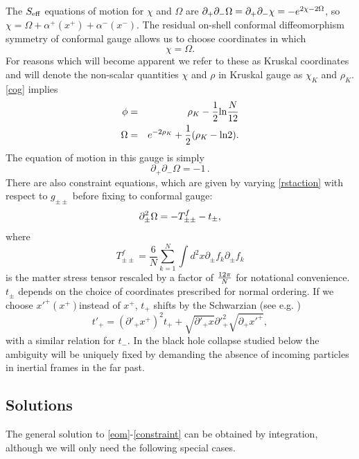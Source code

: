 \documentclass[11pt,oneside,letterpaper]{article}
\newcommand{\f}{\frac}
\newcommand{\be}{\begin{equation}}
\newcommand{\ee}{\end{equation}}
\def\be{\begin{eqnarray}}
\def\ee{\end{eqnarray}}
\newcommand{\bea}{\begin{eqnarray}}
\newcommand{\eea}{\end{eqnarray}}
\let\f=\frac
\def\be{\begin{equation}}
\def\ee{\end{equation}}
\def\del{\partial}
\def\log{{\rm ln}}
\numberwithin{equation}{section}
\def \be {\begin{equation}}
\def \ee {\end{equation}}
\begin{document}
The $S_{\rm eff}$ equations of motion for $\chi$ and $\Omega$ are $\partial_+ \partial_- \Omega = \partial_+ \partial_- \chi= - e^{2 \chi - 2 \Omega}$, so $\chi = \Omega + \alpha^+(x^+) + \alpha^-(x^-)$. The residual on-shell conformal diffeomorphism symmetry of conformal gauge allows us to choose coordinates in which  \be\label{cog} \chi = \Omega.\ee 
For reasons which will become apparent we refer to these as Kruskal coordinates and will denote the non-scalar quantities $\chi$ and $\rho$ in Kruskal gauge as $\chi_K$ and $\rho_K$. \eqref{cog} implies \bea \label{rp} \phi&=&\rho_K - \frac{1}{2}\log \frac{N}{12}\cr \Omega &=& e^{-2\rho_K} + \frac{1}{2}(\rho_K  - \log 2).\eea The equation of motion in this gauge is simply 
\be\label{eom}
\partial_+\partial_- \Omega = -1\,.
\ee
There are also constraint equations, which are given by varying \eqref{rstaction} with respect to $g_{\pm \pm}$ before fixing to conformal gauge:
\be\label{constraint}
\partial_\pm^2 \Omega = -T^{f}_{\pm \pm}-t_\pm \\,
\ee
where 
\be\label{rds}T^f_{\pm\pm}= \f{6}{N}\sum_{k=1}^N\int d^2 x \del_\pm f_k\del_\pm f_k \ee
is the matter stress tensor rescaled by a factor of $12 \pi \over N$ for notational convenience.
 $t_\pm$ depends on the  choice of coordinates prescribed  for normal ordering. If we choose ${x'}^+(x^+)$instead of $x^+$, $t_+$ shifts by the Schwarzian (see e.g. \cite{Fiola:1994ir})
\be\label{sch} t'_+=({\del'}_+ x^+)^2t_++\sqrt{{\del'}_+x}{\del'}_+^2\sqrt{\del_+{x'}^+},\ee
with a similar relation for $t_-$.   In the black hole collapse studied below the ambiguity will be uniquely fixed by 
demanding the absence of incoming particles in inertial frames in the far past. 


\subsection{Solutions}
The general solution to \eqref{eom}-\eqref{constraint} can be obtained by integration, although we will only need the following special cases. 
\end{document}
